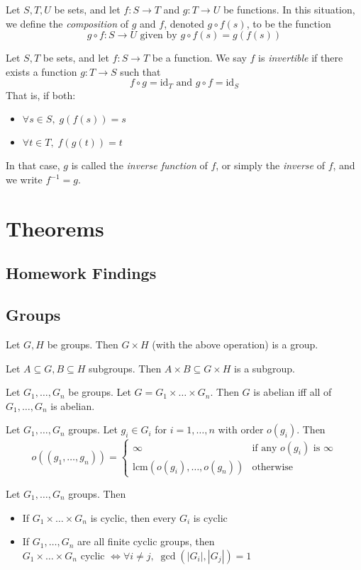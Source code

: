  Let $S, T, U$ be sets, and let $f: S \rightarrow T$ and $g: T \rightarrow U$ be functions. In this situation, we define the \textit{composition} of $g$ and $f$, denoted $g \circ f(s)$, to be the function 
\[g \circ f : S \rightarrow U \text{ given by } g \circ f(s) = g(f(s))\]

 Let $S, T$ be sets, and let $f: S \rightarrow T$ be a function. We say $f$ is \textit{invertible} if there exists a function $g: T \rightarrow S$ such that 
\[ f \circ g = \text{id}_T \text{ and } g \circ f = \text{id}_S \]
That is, if both:
\begin{itemize}
    \item $\forall s \in S, \; g(f(s)) = s$
    \item $\forall t \in T, \; f(g(t)) = t$
\end{itemize}
In that case, $g$ is called the \textit{inverse function} of $f$, or simply the \textit{inverse} of $f$, and we write $f^{-1} = g$.


\section*{Theorems}

\subsection*{Homework Findings}
\subsection*{Groups}
\prop Let $G, H$ be groups. Then $G \times H$ (with the above operation) is a group.

\thm Let $A \subseteq G, B \subseteq H$ subgroups. Then $A \times B \subseteq G \times H$ is a subgroup.

\prop Let $G_1, \ldots, G_n$ be groups. Let $G = G_1 \times \ldots \times G_n$. Then $G$ is abelian iff all of $G_1, \ldots, G_n$ is abelian.

\thm Let $G_1, \ldots, G_n$ groups. Let $g_i \in G_i$ for $i = 1, \ldots, n$ with order $o(g_i)$. Then 
$$o((g_1, \ldots, g_n)) = 
\begin{cases}
    \infty & \text{if any } o(g_i) \text{ is } \infty \\
    \text{lcm}(o(g_i), \ldots, o(g_n)) & \text{otherwise}
\end{cases}$$

\thm Let $G_1, \ldots, G_n$ groups. Then 
\begin{itemize}
    \item If $G_1 \times \ldots \times G_n$ is cyclic, then every $G_i$ is cyclic 
    \item If $G_1, \ldots, G_n$ are all finite cyclic groups, then \\
    $G_1 \times \ldots \times G_n$ cyclic $\Leftrightarrow \forall i \ne j, \; \gcd(|G_i|, |G_j|) = 1$
\end{itemize}

